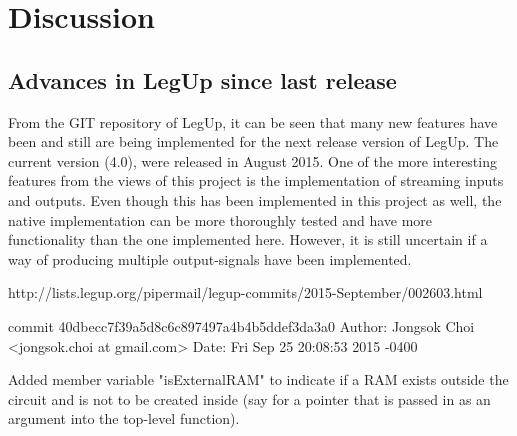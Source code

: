 \chapter{Discussion}

\section{Advances in LegUp since last release}
From the GIT repository of LegUp, it can be seen that many new features have been and still are being implemented for the next release version of LegUp. The current version (4.0), were released in August 2015. One of the more interesting features from the views of this project is the implementation of streaming inputs and outputs. Even though this has been implemented in this project as well, the native implementation can be more thoroughly tested and have more functionality than the one implemented here. However, it is still uncertain if a way of producing multiple output-signals have been implemented.

http://lists.legup.org/pipermail/legup-commits/2015-September/002603.html

commit 40dbecc7f39a5d8c6c897497a4b4b5ddef3da3a0
Author: Jongsok Choi <jongsok.choi at gmail.com>
Date:   Fri Sep 25 20:08:53 2015 -0400

    Added member variable "isExternalRAM" to indicate if a RAM exists
    outside the circuit and is not to be created inside (say for a pointer
    that is passed in as an argument into the top-level function).
    
